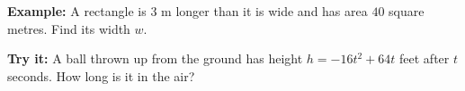 \documentclass[12pt]{article}
\begin{document}
\begin{examplebox}
\textbf{Example:} \quad A rectangle is $3$ m longer than it is wide and has area
$40$ square metres. Find its width $w$.
\end{examplebox}

\begin{tryitbox}
\textbf{Try it:} \quad A ball thrown up from the ground has height
$h = -16t^2 + 64t$ feet after $t$ seconds. How long is it in the air?\\[2pt]
\end{tryitbox}
\end{document}

